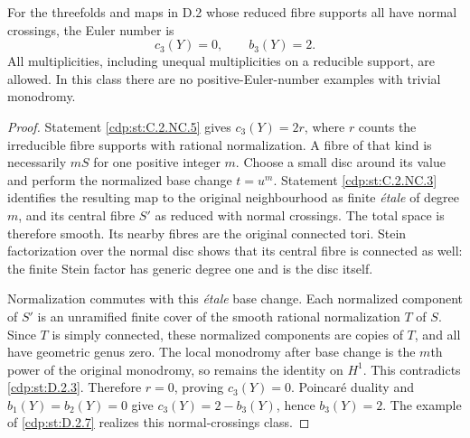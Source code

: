 
\begin{proposition}\label{cdp:st:D.2.4}

For the threefolds and maps in D.2 whose reduced fibre supports
all have normal crossings, the Euler number is
\[
c_3(Y)=0,\qquad b_3(Y)=2.
\]
All multiplicities, including unequal multiplicities on a
reducible support, are allowed. In this class there are no
positive-Euler-number examples with trivial monodromy.
\end{proposition}
\begin{proof}
Statement \ref{cdp:st:C.2.NC.5} gives $c_3(Y)=2r$, where $r$ counts the
irreducible fibre supports with rational normalization. A fibre
of that kind is necessarily $mS$ for one positive integer $m$.
Choose a small disc around its value and perform the normalized
base change $t=u^m$. Statement \ref{cdp:st:C.2.NC.3} identifies the resulting
map to the original neighbourhood as finite \emph{\'etale} of
degree $m$, and its central fibre $S'$ as reduced with normal
crossings. The total space is therefore smooth. Its nearby
fibres are the original connected tori. Stein factorization
over the normal disc shows that its central fibre is connected
as well: the finite Stein factor has generic degree one and is
the disc itself.

Normalization commutes with this \emph{\'etale} base change.
Each normalized component of $S'$ is an unramified finite cover
of the smooth rational normalization $T$ of $S$. Since $T$ is
simply connected, these normalized components are copies of
$T$, and all have geometric genus zero. The local monodromy
after base change is the $m$th power of the original monodromy,
so remains the identity on $H^1$. This contradicts \ref{cdp:st:D.2.3}.
Therefore $r=0$, proving $c_3(Y)=0$. Poincar\'e duality and
$b_1(Y)=b_2(Y)=0$ give $c_3(Y)=2-b_3(Y)$, hence $b_3(Y)=2$.
The example of \ref{cdp:st:D.2.7} realizes this normal-crossings class.
\end{proof}


